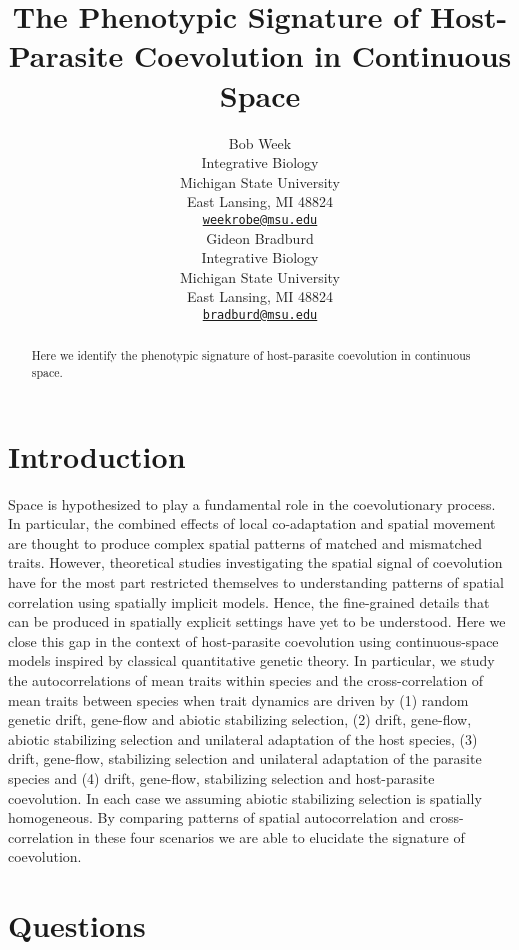 \documentclass{article}
\title{The Phenotypic Signature of Host-Parasite Coevolution in Continuous
Space}
\author{
    Bob Week
   \\
    Integrative Biology \\
    Michigan State University \\
  East Lansing, MI 48824 \\
  \texttt{\href{mailto:weekrobe@msu.edu}{\nolinkurl{weekrobe@msu.edu}}} \\
   \And
    Gideon Bradburd
   \\
    Integrative Biology \\
    Michigan State University \\
  East Lansing, MI 48824 \\
  \texttt{\href{mailto:bradburd@msu.edu}{\nolinkurl{bradburd@msu.edu}}} \\
  }
\begin{document}
\maketitle

\def\tightlist{}


\begin{abstract}
Here we identify the phenotypic signature of host-parasite coevolution
in continuous space.
\end{abstract}


\hypertarget{introduction}{%
\section{Introduction}\label{introduction}}

Space is hypothesized to play a fundamental role in the coevolutionary
process. In particular, the combined effects of local co-adaptation and
spatial movement are thought to produce complex spatial patterns of
matched and mismatched traits. However, theoretical studies
investigating the spatial signal of coevolution have for the most part
restricted themselves to understanding patterns of spatial correlation
using spatially implicit models. Hence, the fine-grained details that
can be produced in spatially explicit settings have yet to be
understood. Here we close this gap in the context of host-parasite
coevolution using continuous-space models inspired by classical
quantitative genetic theory. In particular, we study the
autocorrelations of mean traits within species and the cross-correlation
of mean traits between species when trait dynamics are driven by (1)
random genetic drift, gene-flow and abiotic stabilizing selection, (2)
drift, gene-flow, abiotic stabilizing selection and unilateral
adaptation of the host species, (3) drift, gene-flow, stabilizing
selection and unilateral adaptation of the parasite species and (4)
drift, gene-flow, stabilizing selection and host-parasite coevolution.
In each case we assuming abiotic stabilizing selection is spatially
homogeneous. By comparing patterns of spatial autocorrelation and
cross-correlation in these four scenarios we are able to elucidate the
signature of coevolution.

\hypertarget{questions}{%
\section{Questions}\label{questions}}
\end{document}

